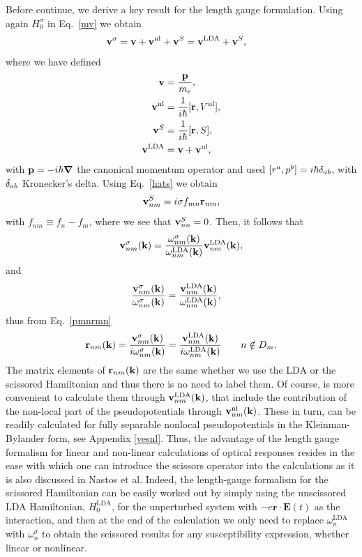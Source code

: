 \documentclass[floatfix,prb,aps,superscriptaddress,11pt,preprint,letterpaper]{revtex4}
\begin{document}
Before continue, 
we derive a key result for the length gauge formulation. Using again $H^\sigma_0$ in
Eq.~\eqref{mv} we obtain
\begin{align}\label{vop2}
\mathbf{v}^\sigma&=
\mathbf{v} 
+
\mathbf{v}^{\mathrm{nl}} 
+\mathbf{v}^S
=
\mathbf{v}^{\mathrm{LDA}} 
+\mathbf{v}^S 
,
\end{align}
where we have defined 
\begin{subequations}
\begin{align}\label{ve}
\mathbf{v} 
&=\frac{\mathbf{p}}{m_e},
\\\label{vnl}
\mathbf{v}^{\mathrm{nl}} 
&=
\frac{1}{i\hbar}[\mathbf{r},V^{\mathrm{nl}}],
\\\label{vs}
\mathbf{v}^S
&=
\frac{1}{i\hbar}[\mathbf{r}, S],
\\\label{vlda}
\mathbf{v}^{\mathrm{LDA}} 
&=
\mathbf{v} 
+\mathbf{v}^{\mathrm{nl}}
,
\end{align}  
\end{subequations}
with $\mathbf{p}=-i\hbar\boldsymbol{\nabla}$ the canonical momentum operator and used
$[r^a,p^b]=i\hbar\delta_{ab}$, with $\delta_{ab}$ Kronecker's delta.
Using Eq.~\eqref{hats} we obtain 
\begin{equation}\label{chon.2} 
\mathbf{v}^S_{nm}=i\sigma f_{mn}\mathbf{r}_{nm},
\end{equation}
with $f_{nm}\equiv f_n-f_m$,
where we see that $\mathbf{v}^S_{nn}=0$. Then, it follows that
\begin{align}\label{chon.9}
\mathbf{v}^\sigma_{nm}(\mathbf{k}) 
=\frac{\omega^\sigma_{nm}(\mathbf{k})}{\omega^{\mathrm{LDA}}_{nm}(\mathbf{k})}
\mathbf{v}^{\mathrm{LDA}}_{nm}(\mathbf{k}) 
,
\end{align}
and
 \begin{align}\label{chon.8}
\frac{\mathbf{v}^\sigma_{nm}(\mathbf{k})}{\omega^\sigma_{nm}(\mathbf{k})}
&=
\frac{\mathbf{v}^{\mathrm{LDA}}_{nm}(\mathbf{k})}{\omega^{\mathrm{LDA}}_{nm}(\mathbf{k})}
,
\end{align}
thus from Eq.~\eqref{pmnrmn} 
\begin{align}\label{chon.10}
\mathbf{r}_{nm}(\mathbf{k}) 
=
\frac{\mathbf{v}^\sigma_{nm}(\mathbf{k})}{i\omega^\sigma_{nm}(\mathbf{k})}
=
\frac{\mathbf{v}^{\mathrm{LDA}}_{nm}(\mathbf{k})}{i\omega^{\mathrm{LDA}}_{nm}(\mathbf{k})}
\quad\quad n\notin D_m 
. 
\end{align}
The matrix elements 
of $\mathbf{r}_{nm}(\mathbf{k})$ are the same whether we use the LDA or the scissored 
Hamiltonian and thus there is no need to label them.
Of course, is more convenient to calculate them
through $\mathbf{v}^{\mathrm{LDA}}_{nm}(\mathbf{k})$, that 
include the contribution of 
the non-local part of the pseudopotentials through
$\mathbf{v}^{\mathrm{nl}}_{nm}(\mathbf{k})$. These in turn, can be readily
calculated
for 
fully separable nonlocal pseudopotentials in the 
Kleinman-Bylander 
form,\cite{francesco,mottaCMS10,kleinman_efficacious_1982,adolphPRB96}
see Appendix \ref{vesnl}.
Thus, the advantage of the length gauge formalism for linear and 
non-linear calculations of optical responses resides in the ease with 
which one can introduce the scissors operator into the calculations as 
it is also discussed in Nastos et al.\cite{nastosPRB05} Indeed, the 
length-gauge formalism for the scissored Hamiltonian can be easily worked 
out by simply using the unscissored LDA Hamiltonian,
$H_0^{\mathrm{LDA}}$,
 for the unperturbed system 
with $-e\mathbf{r}\cdot \mathbf{E}(t)$ as the interaction, and then at the end of the 
calculation we only need to replace $\omega^{\mathrm{LDA}}_{n}$ with 
$\omega_{n}^{\sigma}$
 to obtain the 
scissored results for any susceptibility expression, whether linear or 
nonlinear. 
\end{document}
